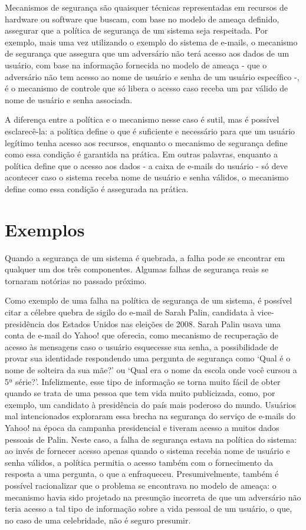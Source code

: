 \documentclass[
	10pt,				%
	openright,			%
	twoside,			%
	a5paper,			%
	english,			%
	french,				%
	spanish,			%
	brazil,				%
	sumario=tradicional
]{abntex2}
\begin{document}
Mecanismos de segurança são quaisquer técnicas representadas em recursos de hardware ou software que buscam, com base no modelo de ameaça definido, assegurar que a política de segurança de um sistema seja respeitada. Por exemplo, mais uma vez utilizando o exemplo do sistema de e-mails, o mecanismo de segurança que assegura que um adversário não terá acesso aos dados de um usuário, com base na informação fornecida no modelo de ameaça - que o adversário não tem acesso ao nome de usuário e senha de um usuário específico -, é o mecanismo de controle que só libera o acesso caso receba um par válido de nome de usuário e senha associada.

A diferença entre a política e o mecanismo nesse caso é sutil, mas é possível esclarecê-la: a política define o que é suficiente e necessário para que um usuário legítimo tenha acesso aos recursos, enquanto o mecanismo de segurança define como essa condição é garantida na prática. Em outras palavras, enquanto a política define que o acesso aos dados - a caixa de e-mails do usuário - só deve acontecer caso o sistema receba nome de usuário e senha válidos, o mecanismo define como essa condição é assegurada na prática.

\section{Exemplos}

Quando a segurança de um sistema é quebrada, a falha pode se encontrar em qualquer um dos três componentes. Algumas falhas de segurança reais se tornaram notórias no passado próximo. 
	
Como exemplo de uma falha na política de segurança de um sistema, é possível citar a célebre quebra de sigilo do e-mail de Sarah Palin, candidata à vice-presidência dos Estados Unidos nas eleições de 2008. Sarah Palin usava uma conta de e-mail do Yahoo! que oferecia, como mecanismo de recuperação de acesso às mensagens caso o usuário esquecesse sua senha, a possibilidade de provar sua identidade respondendo uma pergunta de segurança como ‘Qual é o nome de solteira da sua mãe?’ ou ‘Qual era o nome da escola onde você cursou a 5ª série?’. Infelizmente, esse tipo de informação se torna muito fácil de obter quando se trata de uma pessoa que tem vida muito publicizada, como, por exemplo, um candidato à presidência do país mais poderoso do mundo. Usuários mal intencionados exploraram essa brecha na segurança do serviço de e-mails do Yahoo! na época da campanha presidencial e tiveram acesso a muitos dados pessoais de Palin. Neste caso, a falha de segurança estava na política do sistema: ao invés de fornecer acesso apenas quando o sistema recebia nome de usuário e senha válidos, a política permitia o acesso também com o fornecimento da resposta a uma pergunta, o que a enfraqueceu. Presumivelmente, também é possível racionalizar que o problema se encontrava no modelo de ameaça: o mecanismo havia sido projetado na presunção incorreta de que um adversário não teria acesso a tal tipo de informação sobre a vida pessoal de um usuário, o que, no caso de uma celebridade, não é seguro presumir. 
\end{document}
